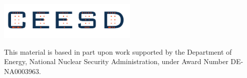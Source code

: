 \documentclass{beamer}
\begin{document}
\begin{frame}\frametitle{}
  \vspace*{0.2in}
  
\begin{center}
\includegraphics[width=0.5\textwidth]{ceesd-logo-2.pdf}\\

\vspace*{0.35in}

\vspace*{0.5in}
\begin{minipage}{0.8\textwidth}
This material is based in part upon work supported by the Department of Energy, National Nuclear Security Administration, under Award Number DE-NA0003963. 
\end{minipage}
\end{center}


\end{frame}
\end{document}
